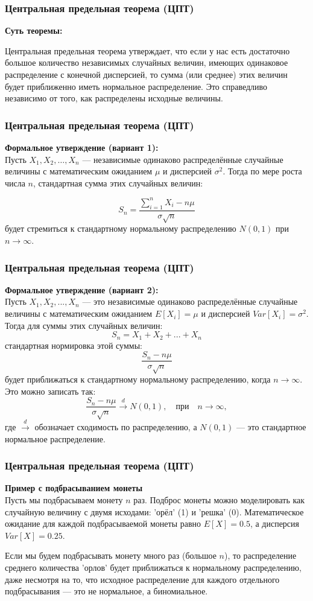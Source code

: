 \documentclass[aspectratio=169]{beamer}
\begin{document}
\begin{frame}
\frametitle{Центральная предельная теорема (ЦПТ)}
{\bf Суть теоремы:}

Центральная предельная теорема утверждает, что если у нас есть достаточно большое количество независимых случайных величин, имеющих одинаковое распределение с конечной дисперсией, то сумма (или среднее) этих величин будет приближенно иметь нормальное распределение. Это справедливо независимо от того, как распределены исходные величины.
\end{frame}

\begin{frame}
\frametitle{Центральная предельная теорема (ЦПТ)}
{\bf Формальное утверждение (вариант 1):}\\
Пусть \(X_1, X_2, \dots, X_n\) — независимые одинаково распределённые случайные величины с математическим ожиданием \(\mu\) и дисперсией \(\sigma^2\). Тогда по мере роста числа \(n\), стандартная сумма этих случайных величин:

\[
S_n = \frac{\sum_{i=1}^{n} X_i - n\mu}{\sigma\sqrt{n}}
\]
будет стремиться к стандартному нормальному распределению \(N(0,1)\) при \(n \to \infty\).
\end{frame}

\begin{frame}
\frametitle{Центральная предельная теорема (ЦПТ)}
{\bf Формальное утверждение (вариант 2):}\\
Пусть \(X_1, X_2, ..., X_n\) — это независимые одинаково распределённые случайные величины с математическим ожиданием \(E[X_i] = \mu\) и дисперсией \(Var[X_i] = \sigma^2\). Тогда для суммы этих случайных величин:
\[
S_n = X_1 + X_2 + ... + X_n
\]
стандартная нормировка этой суммы:
\[
\frac{S_n - n\mu}{\sigma \sqrt{n}}
\]
будет приближаться к стандартному нормальному распределению, когда \(n \to \infty\). Это можно записать так:
\[
\frac{S_n - n\mu}{\sigma \sqrt{n}} \xrightarrow{d} N(0,1), \quad \text{при} \quad n \to \infty,
\]
где \(\xrightarrow{d}\) обозначает сходимость по распределению, а \(N(0,1)\) — это стандартное нормальное распределение.
\end{frame}

\begin{frame}
\frametitle{Центральная предельная теорема (ЦПТ)}
{\bf Пример с подбрасыванием монеты}\\
Пусть мы подбрасываем монету \(n\) раз. Подброс монеты можно моделировать как случайную величину с двумя исходами: 'орёл' (1) и 'решка' (0). Математическое ожидание для каждой подбрасываемой монеты равно \(E[X] = 0.5\), а дисперсия \(Var[X] = 0.25\).

Если мы будем подбрасывать монету много раз (большое \(n\)), то распределение среднего количества 'орлов' будет приближаться к нормальному распределению, даже несмотря на то, что исходное распределение для каждого отдельного подбрасывания — это не нормальное, а биномиальное.
\end{frame}
\end{document}
